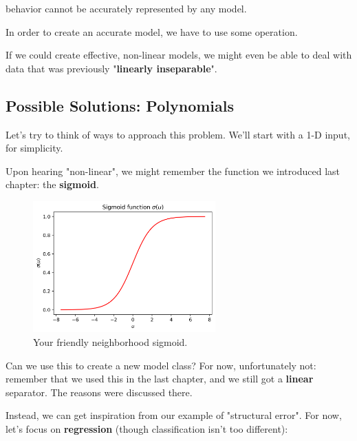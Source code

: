         \begin{concept}
             behavior cannot be accurately represented by any  model. 
    
            In order to create an accurate model, we have to use some  operation.
        \end{concept}
    
        If we could create effective, non-linear models, we might even be able to deal with data that was previously "\textbf{linearly inseparable}".

    \subsecdiv

    \subsection*{Possible Solutions: Polynomials}

        Let's try to think of ways to approach this problem. We'll start with a 1-D input, for simplicity.

        Upon hearing "non-linear", we might remember the function we introduced last chapter: the \textbf{sigmoid}.
    
        \begin{figure}[H]
            \centering
            
            \includegraphics[width=70mm,scale=0.5]{images/feature_images/sigmoid_u.png}
            \caption*{Your friendly neighborhood sigmoid.}
        \end{figure}
    
        Can we use this to create a new model class? For now, unfortunately not: remember that we used this in the last chapter, and we still got a \textbf{linear} separator. The reasons were discussed there.
    
        Instead, we can get inspiration from our example of "structural error". For now, let's focus on \textbf{regression} (though classification isn't too different):
    
